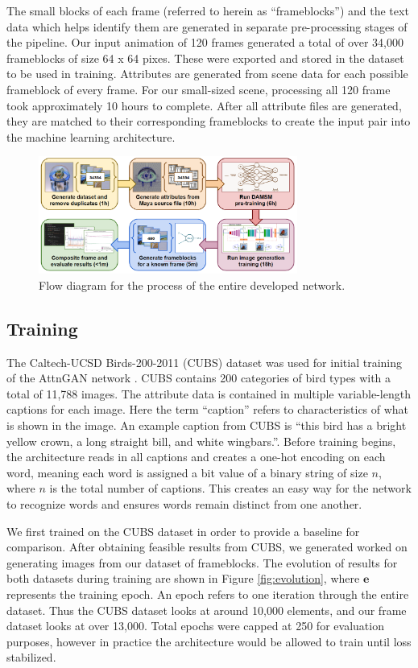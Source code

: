 \documentclass[letterpaper]{article} %
\begin{document}
The small blocks of each frame (referred to herein as ``frameblocks'') and the 
text data which helps identify them are generated in separate pre-processing 
stages of the pipeline. Our input animation of 120 frames 
generated a total of over 34,000 frameblocks of size 64 x 64 pixes. These were 
exported and stored in the dataset to be used in training.
Attributes are generated from scene data for each possible frameblock of every 
frame. For our small-sized scene, processing all 120 frame took approximately 
10 hours to complete. After all attribute files are generated, they are 
matched to their corresponding frameblocks to create the input pair into the 
machine learning architecture.

\begin{figure}[htbp]
\centerline{\includegraphics[width=8.5cm]{flow_diagram.png}}
\caption{Flow diagram for the process of the entire developed network.}
\label{fig:flow_diagram}
\end{figure}

\subsection{Training}
The Caltech-UCSD Birds-200-2011 (CUBS) dataset was used for initial training of 
the AttnGAN network \cite{cubs}. CUBS contains 200 categories of bird types 
with a total of 11,788 images. The attribute data is contained in multiple 
variable-length captions for each image. Here the term ``caption'' refers to 
characteristics of what is shown in the image. An example caption from CUBS is 
``this bird has a bright yellow crown, a long straight bill, and white 
wingbars.''. Before training begins, the architecture reads in all captions and 
creates a one-hot encoding on each word, meaning each word is assigned a bit 
value of a binary string of size $n$, where $n$ is the total number of 
captions. This creates an easy way for the network to recognize words and 
ensures words remain distinct from one another.

We first trained on the CUBS dataset in order to provide a baseline for 
comparison. After obtaining feasible results from CUBS, we generated worked on 
generating images from our dataset of frameblocks. The evolution of results for 
both datasets during training are shown in 
Figure \ref{fig:evolution}, where $\mathbf{e}$ represents the training epoch. 
An epoch refers to one iteration through the entire dataset. Thus the CUBS 
dataset looks at around 10,000 elements, and our frame dataset looks at over 
13,000. Total epochs were capped at 250 for evaluation purposes, however in 
practice the architecture would be allowed to train until loss stabilized.
\end{document}
